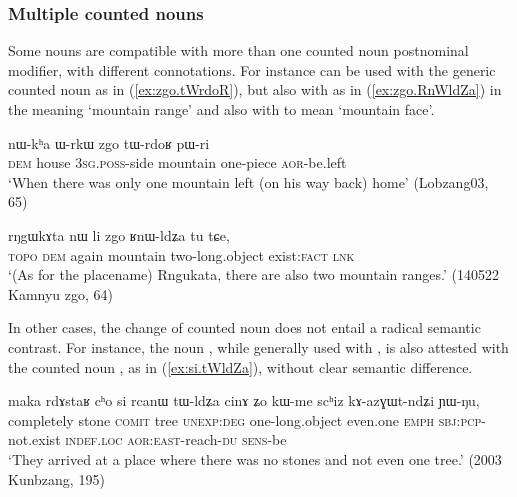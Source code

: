 \subsubsection{Multiple counted nouns} \label{sec:multiple.CN}
Some nouns are compatible with more than one counted noun postnominal modifier, with different connotations. For instance  can be used with the generic counted noun  as in (\ref{ex:zgo.tWrdoR}), but also with    as in (\ref{ex:zgo.RnWldZa}) in the meaning `mountain range' and also with  to mean `mountain face'.

\begin{exe}
\ex \label{ex:zgo.tWrdoR}
\gll nɯ-kʰa ɯ-rkɯ zgo tɯ-rdoʁ pɯ-ri \\
\textsc{dem} house \textsc{3sg}.\textsc{poss}-side mountain one-piece \textsc{aor}-be.left  \\
\glt `When there was only one mountain left (on his way back) home' (Lobzang03, 65)
\end{exe}

\begin{exe}
\ex \label{ex:zgo.RnWldZa}
\gll rŋgɯkɤta nɯ li zgo ʁnɯ-ldʑa tu tɕe, \\
\textsc{topo} \textsc{dem} again mountain two-long.object exist:\textsc{fact} \textsc{lnk} \\
\glt `(As for the placename) Rngukata, there are also two mountain ranges.' (140522 Kamnyu zgo, 64)
\end{exe}

In other cases, the change of counted noun does not entail a radical semantic contrast. For instance, the noun , while generally used with , is also attested with the counted noun , as in (\ref{ex:si.tWldZa}), without clear semantic difference.

\begin{exe}
\ex \label{ex:si.tWldZa}
\gll maka rdɤstaʁ cʰo si rcanɯ tɯ-ldʑa cinɤ ʑo kɯ-me scʰiz kɤ-azɣɯt-ndʑi ɲɯ-ŋu, \\
completely stone \textsc{comit} tree \textsc{unexp}:\textsc{deg} one-long.object even.one \textsc{emph} \textsc{sbj}:\textsc{pcp}-not.exist \textsc{indef}.\textsc{loc} \textsc{aor}:\textsc{east}-reach-\textsc{du} \textsc{sens}-be  \\
\glt `They arrived at a place where there was no stones and not even one tree.' (2003 Kunbzang, 195)
\end{exe}




